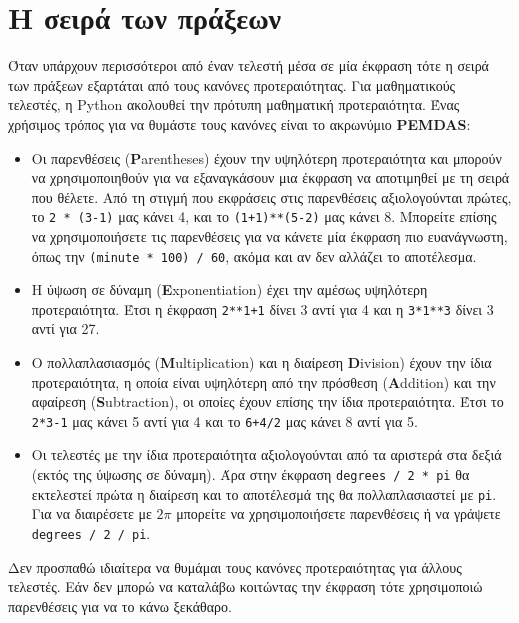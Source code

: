 \documentclass[10pt]{book}
\begin{document}
\section{Η σειρά των πράξεων}
Όταν υπάρχουν περισσότεροι από έναν τελεστή μέσα σε μία έκφραση τότε 
η σειρά των πράξεων εξαρτάται από τους κανόνες προτεραιότητας.  
Για μαθηματικούς τελεστές, η  Python  ακολουθεί την πρότυπη
μαθηματική προτεραιότητα.  Ένας χρήσιμος τρόπος για να θυμάστε τους
κανόνες είναι το ακρωνύμιο {\bf PEMDAS}:

\begin{itemize}

\item Οι παρενθέσεις  ({\bf P}arentheses)  έχουν την υψηλότερη προτεραιότητα και μπορούν να χρησιμοποιηθούν για να εξαναγκάσουν μια έκφραση να αποτιμηθεί με
τη σειρά που θέλετε.  Από τη στιγμή που εκφράσεις στις παρενθέσεις
αξιολογούνται πρώτες, το  {\tt 2 * (3-1)}  μας κάνει 4, και το
{\tt (1+1)**(5-2)}  μας κάνει 8.  Μπορείτε επίσης να χρησιμοποιήσετε
τις παρενθέσεις για να κάνετε μία έκφραση πιο ευανάγνωστη, όπως την 
{\tt (minute * 100) / 60},  ακόμα και αν δεν αλλάζει το αποτέλεσμα.

\item
Η ύψωση σε δύναμη ({\bf E}xponentiation) έχει την αμέσως υψηλότερη
προτεραιότητα. Έτσι η έκφραση {\tt 2**1+1} δίνει 3 αντί για 4 και η {\tt 3*1**3} δίνει 3 αντί για 27.

\item Ο πολλαπλασιασμός ({\bf M}ultiplication) 
και η διαίρεση {\bf D}ivision) έχουν την ίδια προτεραιότητα,
η οποία είναι υψηλότερη από την πρόσθεση ({\bf A}ddition)  και
την αφαίρεση ({\bf S}ubtraction), οι οποίες έχουν επίσης την
ίδια προτεραιότητα.  Έτσι το {\tt 2*3-1} μας κάνει 5 αντί για 4 και 
το {\tt 6+4/2} μας κάνει 8 αντί για 5.

\item Οι τελεστές με την ίδια προτεραιότητα αξιολογούνται από τα
αριστερά στα δεξιά (εκτός της ύψωσης σε δύναμη). Άρα στην έκφραση 
{\tt degrees / 2 * pi} θα εκτελεστεί πρώτα η διαίρεση και το αποτέλεσμά
της θα πολλαπλασιαστεί με {\tt pi}. Για να διαιρέσετε με $2 \pi$
μπορείτε να χρησιμοποιήσετε παρενθέσεις ή να γράψετε {\tt degrees / 2 / pi}.

\end{itemize}

Δεν προσπαθώ ιδιαίτερα να θυμάμαι τους κανόνες προτεραιότητας για
άλλους τελεστές.  Εάν δεν μπορώ να καταλάβω κοιτώντας την έκφραση τότε
χρησιμοποιώ παρενθέσεις για να το κάνω ξεκάθαρο.
\end{document}
